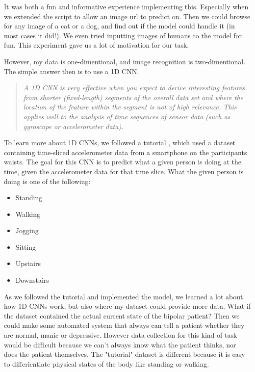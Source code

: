 It was both a fun and informative experience implementing this. Especially when we extended the script to allow an image url to predict on. 
Then we could browse for any image of a cat or a dog, and find out if the model could handle it (in most cases it did!). 
We even tried inputting images of humans to the model for fun. This experiment gave us a lot of motivation for our task.

\newpage

However, my data is one-dimentional, and image recognition is two-dimentional. The simple answer then is to use a 1D CNN.

\begin{quote}
  \textit{A 1D CNN is very effective when you expect to derive interesting features from shorter (fixed-length) segments of the overall data set 
  and where the location of the feature within the segment is not of high relevance. This applies well to the analysis of time sequences of sensor data 
  (such as gyroscope or accelerometer data).} \cite{1d_cnn}
\end{quote}

To learn more about 1D CNNs, we followed a tutorial \cite{1d_cnn}, which used a dataset containing 
time-sliced accelerometer data from a smartphone on the participants waists. The goal for this CNN is to predict what a given person is doing 
at the time, given the accelerometer data for that time slice. What the given person is doing is one of the following:
\begin{itemize}
  \item Standing
  \item Walking
  \item Jogging
  \item Sitting
  \item Upstairs
  \item Downstairs
\end{itemize}

As we followed the tutorial and implemented the model, we learned a lot about how 1D CNNs work, but also where my dataset could provide more data. 
What if the dataset contained the actual current state of the bipolar patient? Then we could make some automated system that always can tell a patient 
whether they are normal, manic or depressive. However data collection for this kind of task would be difficult because we can't always know what the
patient thinks, nor does the patient themselves. The "tutorial" dataset is different because it is easy to differientiate physical states of the body
like standing or walking.